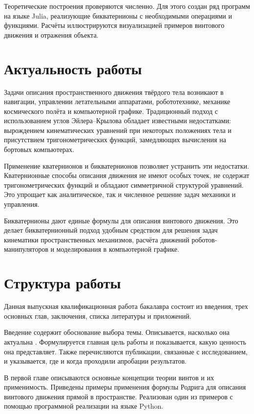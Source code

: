 Теоретические построения проверяются численно. Для этого создан ряд программ на языке Julia, реализующие бикватернионы с необходимыми операциями и функциями. Расчёты иллюстрируются визуализацией примеров винтового движения и отражения объекта.

\section*{Актуальность работы}

Задачи описания пространственного движения твёрдого тела возникают в навигации, управлении летательными аппаратами, робототехнике, механике космического полёта и компьютерной графике. Традиционный подход с использованием углов Эйлера–Крылова обладает известными недостатками: вырождением кинематических уравнений при некоторых положениях тела и присутствием тригонометрических функций, замедляющих вычисления на бортовых компьютерах.

Применение кватернионов и бикватернионов позволяет устранить эти недостатки. Кватернионные способы описания движения не имеют особых точек, не содержат тригонометрических функций и обладают симметричной структурой уравнений. Это упрощает как аналитическое, так и численное решение задач механики и управления.

Бикватернионы дают единые формулы для описания винтового движения. Это делает бикватернионный подход удобным средством для решения задач кинематики пространственных механизмов, расчёта движений роботов-манипуляторов и моделирования в компьютерной графике.

\section*{Структура работы}

Данная выпускная квалификационная работа бакалавра состоит из введения, трех основных глав, заключения, списка литературы и приложений.

Введение содержит обоснование выбора темы. Описывается, насколько она актуальна . Формулируется главная цель работы и показывается, какую ценность она представляет. Также перечисляются публикации, связанные с исследованием, и указывается, где и когда проходили апробации результатов.

В первой главе описываются основные концепции теории винтов и их применимость. Приведены примеры применения формулы Родрига для описания винтового движения прямой в пространстве. Реализован один из примеров с помощью программной реализации на языке Python.

